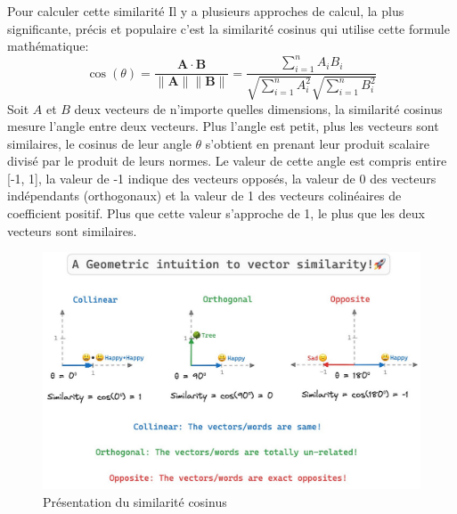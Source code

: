 \noindent
Pour calculer cette similarité Il y a plusieurs approches de calcul, la plus significante, précis et populaire c'est la similarité cosinus qui utilise cette formule mathématique:
\[\cos(\theta) = \frac{\mathbf{A} \cdot \mathbf{B}}{\|\mathbf{A}\|\|\mathbf{B}\|} = \frac{\sum_{i=1}^{n} A_i B_i}{\sqrt{\sum_{i=1}^{n} A_i^2} \sqrt{\sum_{i=1}^{n} B_i^2}}
\]
Soit $A$ et $B$ deux vecteurs de n'importe quelles dimensions, la similarité cosinus mesure l'angle entre deux vecteurs. Plus l'angle est petit, plus les vecteurs sont similaires, le cosinus de leur angle $\theta$ s'obtient en prenant leur produit scalaire divisé par le produit de leurs normes. Le valeur de cette angle est compris entire [-1, 1], la valeur de -1 indique des vecteurs opposés, la valeur de 0 des vecteurs indépendants (orthogonaux) et la valeur de 1 des vecteurs colinéaires de coefficient positif. Plus que cette valeur s'approche de 1, le plus que les deux vecteurs sont similaires.

\begin{figure}[H]
\centering
\includegraphics[width=1\textwidth]{logos/cosine.png}
\caption{Présentation du similarité cosinus}
\label{fig:cosine}
\end{figure}

